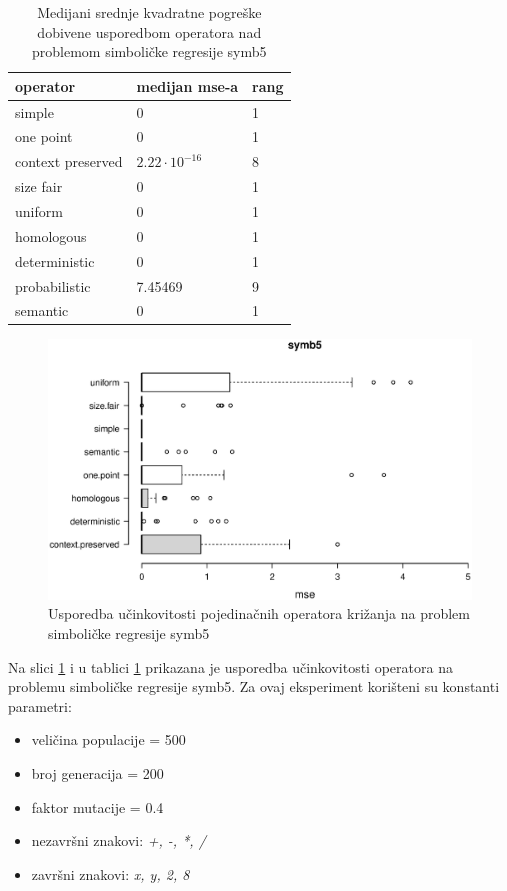 \begin{table}[H]
 	\centering
 \caption{Medijani srednje kvadratne pogreške dobivene usporedbom operatora nad problemom simboličke regresije symb5}
 
    \begin{tabular}{| l | l | l |}
    \hline
    \textbf{operator} & \textbf{medijan mse-a} & \textbf{rang}\\ \hline
    simple & 0 & 1\\ \hline
    one point & 0 & 1\\ \hline
    context preserved & $2.22 \cdot 10^{-16}$& 8\\ \hline
    size fair & 0 & 1\\ \hline
    uniform & 0 & 1\\ \hline
    homologous & 0 & 1\\ \hline
    deterministic & 0 & 1\\ \hline
    probabilistic & 7.45469 & 9\\ \hline
    semantic & 0 & 1\\ \hline
    \end{tabular}
    
   
    \label{symb5table}
\end{table}

\begin{figure}[H]
	\centering
	\includegraphics[trim=0cm 4cm 0cm 0cm, scale=0.6]{./slike/boxPlots/symb5.eps}
	\caption{Usporedba učinkovitosti pojedinačnih operatora križanja na problem simboličke regresije symb5}
	\label{symb5box}
\end{figure}


Na slici \ref{symb5box} i u tablici \ref{symb5table} prikazana je usporedba učinkovitosti operatora na problemu simboličke regresije symb5. Za ovaj eksperiment korišteni su konstanti parametri:
\begin{itemize}
\item{veličina populacije = 500}
\item{broj generacija = 200}
\item{faktor mutacije = 0.4}
\item{nezavršni znakovi: \textit{+, -, *, /}}
\item{završni znakovi: \textit{x, y, 2, 8}}
\end{itemize} 

